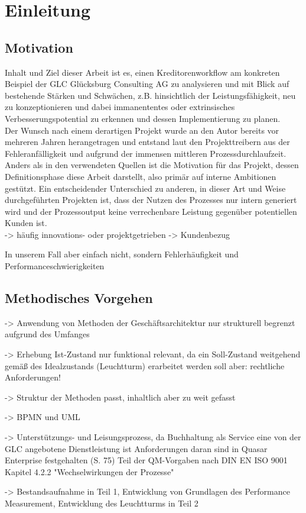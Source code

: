 \chapter{Einleitung}

\section{Motivation}

Inhalt und Ziel dieser Arbeit ist es, einen Kreditorenworkflow am konkreten Beispiel der GLC Glücksburg Consulting AG zu analysieren und mit Blick auf bestehende Stärken und Schwächen, z.B. hinsichtlich der Leistungsfähigkeit, neu zu konzeptionieren und dabei immanententes oder extrinsisches Verbesserungspotential zu erkennen und dessen Implementierung zu planen.\\
Der Wunsch nach einem derartigen Projekt wurde an den Autor bereits vor mehreren Jahren herangetragen und entstand laut den Projekttreibern aus der Fehleranfälligkeit und aufgrund der immensen mittleren Prozessdurchlaufzeit. \\
Anders als in den verwendeten Quellen ist die Motivation für das Projekt, dessen Definitionsphase diese Arbeit darstellt, also primär auf interne Ambitionen gestützt.
Ein entscheidender Unterschied zu anderen, in dieser Art und Weise durchgeführten Projekten ist, dass der Nutzen des Prozesses nur intern generiert wird und der Prozessoutput keine verrechenbare Leistung gegenüber potentiellen Kunden ist.\\


-> häufig innovations- oder projektgetrieben
-> Kundenbezug

In unserem Fall aber einfach nicht, sondern Fehlerhäufigkeit und Performanceschwierigkeiten

\section{Methodisches Vorgehen}


-> Anwendung von Methoden der Geschäftsarchitektur nur strukturell begrenzt aufgrund des Umfanges

-> Erhebung Ist-Zustand nur funktional relevant, da ein Soll-Zustand weitgehend gemäß des Idealzustands (Leuchtturm) erarbeitet werden soll
aber: rechtliche Anforderungen!

-> Struktur der Methoden passt, inhaltlich aber zu weit gefasst

-> BPMN und UML

-> Unterstützungs- und Leisungsprozess, da Buchhaltung als Service eine von der GLC angebotene Dienstleistung ist
Anforderungen daran sind in Quasar Enterprise festgehalten (S. 75)
Teil der QM-Vorgaben nach DIN EN ISO 9001 Kapitel 4.2.2 "Wechselwirkungen der Prozesse" 

-> Bestandsaufnahme in Teil 1, Entwicklung von Grundlagen des Performance Measurement, Entwicklung des Leuchtturms in Teil 2

\subsection{}